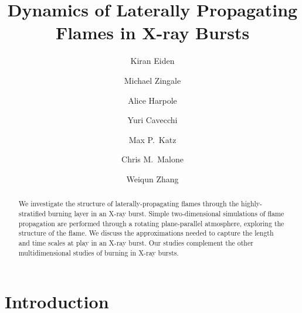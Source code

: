 \documentclass[twocolumn,times,tighten]{aastex62}
\begin{document}
\title{Dynamics of Laterally Propagating Flames in X-ray Bursts}


\author{Kiran Eiden}

\author[0000-0001-8401-030X]{Michael Zingale}

\author[0000-0002-1530-781X]{Alice Harpole}

\author{Yuri Cavecchi}


\author{Max P.\ Katz}

%
\author{Chris M.\ Malone}

\author{Weiqun Zhang}




\begin{abstract}
We investigate the structure of laterally-propagating flames through
the highly-stratified burning layer in an X-ray burst.  Simple
two-dimensional simulations of flame propagation are performed through
a rotating plane-parallel atmosphere, exploring the structure of the
flame.  We discuss the approximations needed to capture the length and
time scales at play in an X-ray burst.  Our studies complement the
other multidimensional studies of burning in X-ray bursts.
\end{abstract}


\section{Introduction}\label{Sec:Introduction}
\end{document}
